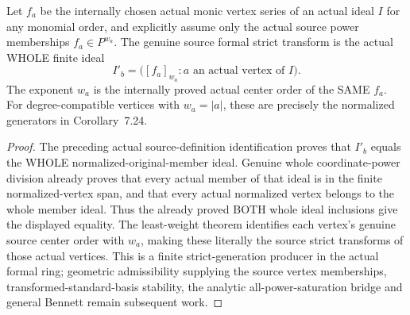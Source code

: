 \begin{theorem}
\label{hir:actual-formal-strict-ideal-finite-vertex-generators}
Let $f_a$ be the internally chosen actual monic vertex series of an
actual ideal $I$ for any monomial order, and explicitly assume only the
actual source power memberships $f_a\in P^{w_a}$.
The genuine source formal strict transform is the actual WHOLE finite ideal
\[
 I'_b=\bigl([f_a]_{w_a}:a\text{ an actual vertex of }I\bigr).
\]
The exponent $w_a$ is the internally proved actual center order of the
SAME $f_a$. For degree-compatible vertices with $w_a=|a|$, these are
precisely the normalized generators in Corollary~7.24.
\leanok
\end{theorem}
\begin{proof}
The preceding actual source-definition identification proves that $I'_b$
equals the WHOLE normalized-original-member ideal. Genuine whole
coordinate-power division already proves that every actual member of
that ideal is in the finite normalized-vertex span, and that every
actual normalized vertex belongs to the whole member ideal. Thus the
already proved BOTH whole ideal inclusions give the displayed equality.
The least-weight theorem identifies each vertex's genuine source center
order with $w_a$, making these literally the source strict transforms
of those actual vertices. This is a finite strict-generation producer
in the actual formal ring; geometric admissibility supplying the source
vertex memberships, transformed-standard-basis stability, the analytic
all-power-saturation bridge and general Bennett remain subsequent work.
\end{proof}
